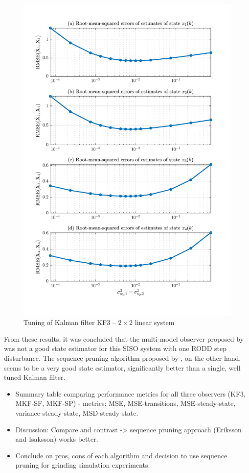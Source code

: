 \begin{figure}[htp]
	\centering
	\includegraphics[width=13cm]{images/rod_obs_sim2_3KF_Q_seed_0.pdf}
	\caption{Tuning of Kalman filter KF3 – $2\times2$ linear system}
	\label{fig:sim-sys-siso--KF3-tuning}
\end{figure}

From these results, it was concluded that the multi-model observer proposed by \cite{robertson_method_1998} was not a good state estimator for this SISO system with one \gls{RODD} step disturbance. The sequence pruning algorithm proposed by \cite{eriksson_classification_1996}, on the other hand, seems to be a very good state estimator, significantly better than a single, well tuned Kalman filter.


\begin{itemize}
	\item Summary table comparing performance metrics for all three observers (KF3, MKF-SF, MKF-SP) - metrics: MSE, MSE-transitions, MSE-steady-state, variance-steady-state, MSD-steady-state.
	\item Discussion: Compare and contrast -> sequence pruning approach (Eriksson and Isaksson) works better.
	\item Conclude on pros, cons of each algorithm and decision to use sequence pruning for grinding simulation experiments.
\end{itemize}


